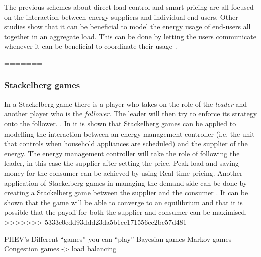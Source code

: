 The previous schemes about direct load control and smart pricing are all focused on the interaction between energy suppliers and individual end-users. Other studies show \cite{Mohsenian-RadWongJatskevichEtAl2010} that it can be beneficial to model the energy usage of end-users all together in an aggregate load. This can be done by letting the users communicate whenever it can be beneficial to coordinate their usage \cite{Mohsenian-RadWongJatskevichEtAl2010}. 

   
=======
\subsubsection{Stackelberg games}
In a Stackelberg game there is a player who takes on the role of the \textit{leader} and another player who is the \textit{follower}. The leader will then try to enforce its strategy onto the follower. \cite{ShohamLeyton-Brown2008}.
In \cite{ChenKishoreSnyder2011} it is shown that Stackelberg games can be applied to modelling the interaction between an energy management controller (i.e. the unit that controls when household appliances are scheduled) and the supplier of the energy. The energy management controller will take the role of following the leader, in this case the supplier after setting the price. Peak load and saving money for the consumer can be achieved by using Real-time-pricing. Another application of Stackelberg games in managing the demand side can be done by creating a Stackelberg game between the supplier and the consumer \cite{MaharjanZhuZhangEtAl2013}. It can be shown that the game will be able to converge to an equilibrium and that it is possible that the payoff for both the supplier and consumer can be maximised.
>>>>>>> 5333e0edd93ddd23da5b1cc171556cc2bc57d481


PHEV’s
Different “games” you can “play”
Bayesian games
Markov games
Congestion games -> load balancing
